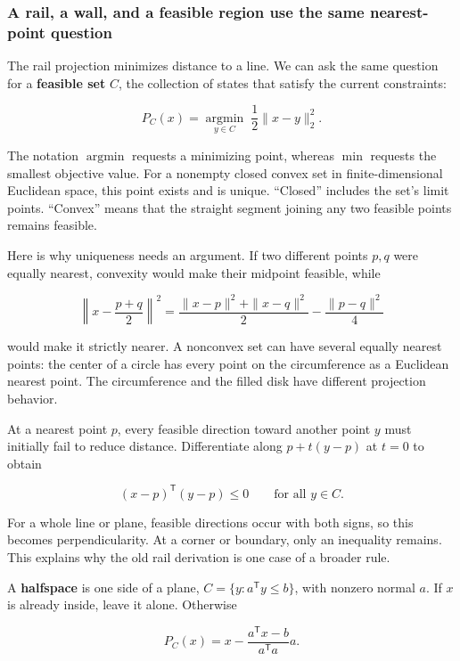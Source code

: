 \subsubsection{A rail, a wall, and a feasible region use the same nearest-point question}\label{a-rail-a-wall-and-a-feasible-region-use-the-same-nearest-point-question}

The rail projection minimizes distance to a line. We can ask the same question for a \textbf{feasible set} \(C\), the collection of states that satisfy the current constraints:

\[
P_C(x)=\underset{y\in C}{\operatorname{argmin}}\;\frac12\|x-y\|_2^2.
\]

The notation \(\operatorname{argmin}\) requests a minimizing point, whereas \(\min\) requests the smallest objective value. For a nonempty closed convex set in finite-dimensional Euclidean space, this point exists and is unique. ``Closed'' includes the set's limit points. ``Convex'' means that the straight segment joining any two feasible points remains feasible.

Here is why uniqueness needs an argument. If two different points \(p,q\) were equally nearest, convexity would make their midpoint feasible, while

\[
\left\|x-\frac{p+q}{2}\right\|^2
=\frac{\|x-p\|^2+\|x-q\|^2}{2}-\frac{\|p-q\|^2}{4}
\]

would make it strictly nearer. A nonconvex set can have several equally nearest points: the center of a circle has every point on the circumference as a Euclidean nearest point. The circumference and the filled disk have different projection behavior.

At a nearest point \(p\), every feasible direction toward another point \(y\) must initially fail to reduce distance. Differentiate along \(p+t(y-p)\) at \(t=0\) to obtain

\[
(x-p)^{\mathsf T}(y-p)\le0\qquad\text{for all }y\in C.
\]

For a whole line or plane, feasible directions occur with both signs, so this becomes perpendicularity. At a corner or boundary, only an inequality remains. This explains why the old rail derivation is one case of a broader rule.

A \textbf{halfspace} is one side of a plane, \(C=\{y:a^{\mathsf T}y\le b\}\), with nonzero normal \(a\). If \(x\) is already inside, leave it alone. Otherwise

\[
P_C(x)=x-\frac{a^{\mathsf T}x-b}{a^{\mathsf T}a}a.
\]

